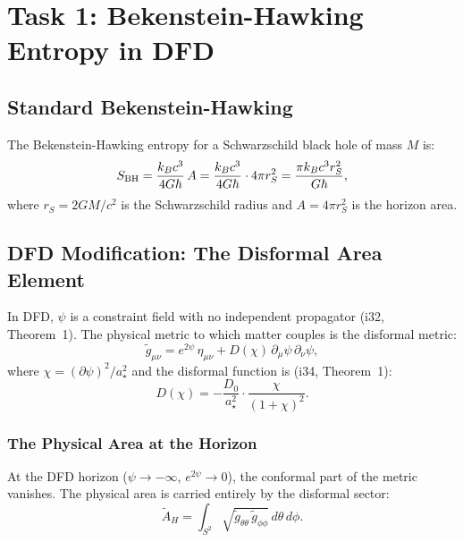 \documentclass[11pt,a4paper]{article}
\begin{document}
\section{Task 1: Bekenstein-Hawking Entropy in DFD}
\label{sec:BH-entropy}

\subsection{Standard Bekenstein-Hawking}

The Bekenstein-Hawking entropy for a Schwarzschild black hole of mass $M$ is:
\begin{equation}\label{eq:SBH}
S_{\rm BH} = \frac{k_B c^3}{4G\hbar}\,A = \frac{k_B c^3}{4G\hbar}\cdot 4\pi r_S^2 = \frac{\pi k_B c^3 r_S^2}{G\hbar},
\end{equation}
where $r_S = 2GM/c^2$ is the Schwarzschild radius and $A = 4\pi r_S^2$ is the horizon area.

\subsection{DFD Modification: The Disformal Area Element}

In DFD, $\psi$ is a constraint field with no independent propagator (i32, Theorem~1). The physical metric to which matter couples is the disformal metric:
\begin{equation}\label{eq:disformal-metric}
\tilde{g}_{\mu\nu} = e^{2\psi}\,\eta_{\mu\nu} + D(\chi)\,\partial_\mu\psi\,\partial_\nu\psi,
\end{equation}
where $\chi = (\partial\psi)^2/a_\star^2$ and the disformal function is (i34, Theorem~1):
\begin{equation}\label{eq:D-function}
D(\chi) = -\frac{D_0}{a_\star^2}\cdot\frac{\chi}{(1+\chi)^2}.
\end{equation}

\subsubsection{The Physical Area at the Horizon}

At the DFD horizon ($\psi \to -\infty$, $e^{2\psi} \to 0$), the conformal part of the metric vanishes. The physical area is carried entirely by the disformal sector:
\begin{equation}\label{eq:phys-area}
\tilde{A}_H = \int_{S^2}\sqrt{\tilde{g}_{\theta\theta}\,\tilde{g}_{\phi\phi}}\,d\theta\,d\phi.
\end{equation}
\end{document}
